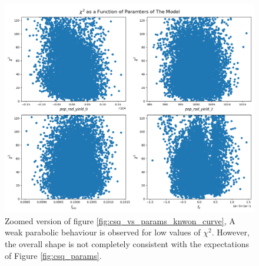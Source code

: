 \documentclass[12pt, TexShade, letterpaper]{report}
\begin{document}
\begin{figure}[h!]
\centering
\includegraphics[scale =0.5]{csq_vs_params_zoomed_known_curve.png}
\caption[Chi-Square of Drawn samples as a function of parameter values for the mock data, zoomed version]{Zoomed version of figure \ref{fig:csq_vs_params_knwon_curve}, A weak parabolic behaviour is observed for low values of $\chi^2$. However, the overall shape is not completely consistent with the expectations of Figure \ref{fig:csq_params}.}
\label{fig:csq_vs_params_zoomed_known_curve}
\end{figure}
\end{document}
